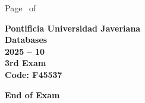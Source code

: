 \documentclass[11pt, addpoints]{exam}\usepackage[utf8]{inputenc}
\begin{document}
\begin{coverpages}
\begin{center}
			\vspace{3mm}
			\leavevmode \hspace{5mm} 
		\end{center}
	\end{coverpages}

	\footer{} {Page \thepage\ of \numpages} {}

	\centering
	\textbf{\Large Pontificia Universidad Javeriana}\\
	\textbf{\Large Databases} \\
	\textbf{\large 2025 -- 10} \\
	\textbf{\large 3rd Exam} \\
	\textbf{Code: F45537}


	\begin{questions}
		
		
		
		
		
		
		
		
		
		
		
		
		
		
		
		
		
		
		
		
	\end{questions}

	\vspace{5mm}
	\noindent \textbf{End of Exam}
\end{document}
